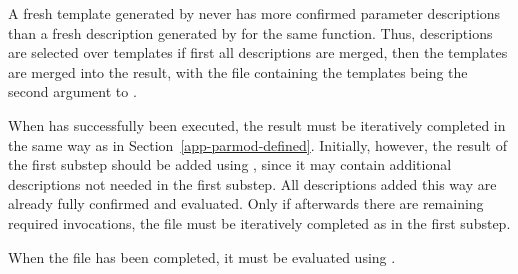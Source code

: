 A fresh template generated by  never has more confirmed parameter descriptions than a fresh 
description generated by  for the same function. Thus, descriptions are selected over templates
if first all descriptions are merged, then the templates are merged into the result, with the file containing the
templates being the second argument to .

When  has successfully been executed, the result must be iteratively completed in the same way 
as in Section~\ref{app-parmod-defined}. Initially, however, the result of the first substep should be added 
using , since it may contain additional descriptions not needed in the first substep.
All descriptions added this way are already fully confirmed and evaluated. Only if afterwards there are remaining 
required invocations, the file must be iteratively completed as in the first substep. 

When the file has been completed, it must be evaluated using .
